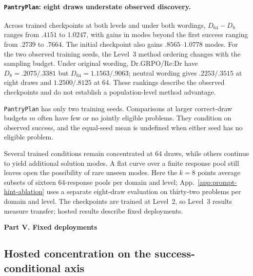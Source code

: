 \paragraph{\texttt{PantryPlan}: eight draws understate observed discovery.}
Across trained checkpoints at both levels and under both wordings,
$D_{64}-D_8$ ranges from $.4151$ to $1.0247$, with gains in modes beyond
the first success ranging from $.2739$ to $.7664$. The initial checkpoint
also gains $.8565$--$1.0778$ modes. For the two observed training seeds,
the Level~3 method ordering changes with the sampling budget. Under original
wording, Dr.GRPO/Re:Dr have $D_8=.2075/.3381$ but
$D_{64}=1.1563/.9063$; neutral wording gives $.2253/.3515$ at eight draws
and $1.2500/.8125$ at 64. These rankings describe the observed checkpoints
and do not establish a population-level method advantage.

\texttt{PantryPlan} has only two training seeds. Comparisons at larger
correct-draw budgets $m$ often have few or no jointly eligible problems.
They condition on observed success, and the equal-seed mean is undefined
when either seed has no eligible problem.

Several trained conditions remain concentrated at 64 draws, while others
continue to yield additional solution modes. A flat curve over a finite
response pool still leaves open the possibility of rare unseen modes.
Here the $k=8$ points average subsets of sixteen 64-response pools per
domain and level; App.~\ref{app:prompt-hint-ablation} uses a separate
eight-draw evaluation on thirty-two problems per domain and level.
The checkpoints are trained at Level~2, so Level~3 results measure transfer;
hosted results describe fixed deployments.






\clearpage
{}
\begin{center}\large\textbf{Part V. Fixed deployments}\end{center}



\subsection{Hosted concentration on the success-conditional axis}
\label{app:hosted-mode-diversity}

